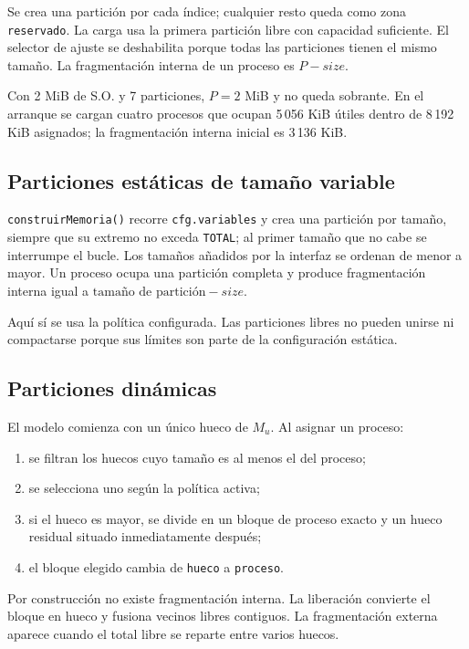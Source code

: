 \documentclass[11pt,a4paper]{article}
\newcommand{\funcion}[1]{\texttt{#1()}}
\begin{document}
Se crea una partición por cada índice; cualquier resto queda como zona
\texttt{reservado}. La carga usa la primera partición libre con capacidad
suficiente. El selector de ajuste se deshabilita porque todas las particiones
tienen el mismo tamaño. La fragmentación interna de un proceso es \(P-size\).

Con 2 MiB de S.O. y 7 particiones, \(P=2\) MiB y no queda sobrante. En el arranque
se cargan cuatro procesos que ocupan 5\,056 KiB útiles dentro de 8\,192 KiB
asignados; la fragmentación interna inicial es 3\,136 KiB.

\subsection{Particiones estáticas de tamaño variable}

\funcion{construirMemoria} recorre \texttt{cfg.variables} y crea una partición por
tamaño, siempre que su extremo no exceda \texttt{TOTAL}; al primer tamaño que no
cabe se interrumpe el bucle. Los tamaños añadidos por la interfaz se ordenan de
menor a mayor. Un proceso ocupa una partición completa y produce fragmentación
interna igual a \(\text{tamaño de partición}-size\).

Aquí sí se usa la política configurada. Las particiones libres no pueden unirse ni
compactarse porque sus límites son parte de la configuración estática.

\subsection{Particiones dinámicas}

El modelo comienza con un único hueco de \(M_u\). Al asignar un proceso:

\begin{enumerate}
  \item se filtran los huecos cuyo tamaño es al menos el del proceso;
  \item se selecciona uno según la política activa;
  \item si el hueco es mayor, se divide en un bloque de proceso exacto y un hueco
  residual situado inmediatamente después;
  \item el bloque elegido cambia de \texttt{hueco} a \texttt{proceso}.
\end{enumerate}

Por construcción no existe fragmentación interna. La liberación convierte el
bloque en hueco y fusiona vecinos libres contiguos. La fragmentación externa
aparece cuando el total libre se reparte entre varios huecos.
\end{document}
